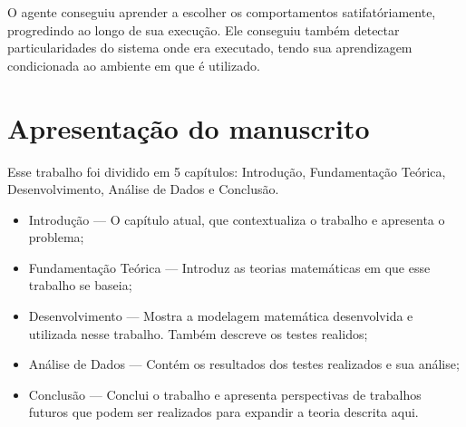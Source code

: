 O agente conseguiu aprender a escolher os comportamentos satifatóriamente, progredindo ao longo de sua execução. Ele conseguiu também detectar particularidades do sistema onde era executado, tendo sua aprendizagem condicionada ao ambiente em que é utilizado.


\section{Apresentação do manuscrito}

Esse trabalho foi dividido em 5 capítulos: Introdução, Fundamentação Teórica, Desenvolvimento, Análise de Dados e Conclusão.

\begin{itemize}
	\item Introdução --- O capítulo atual, que contextualiza o trabalho e apresenta o problema;
	\item Fundamentação Teórica --- Introduz as teorias matemáticas em que esse trabalho se baseia;
	\item Desenvolvimento --- Mostra a modelagem matemática desenvolvida e utilizada nesse trabalho. Também descreve os testes realidos;
	\item Análise de Dados --- Contém os resultados dos testes realizados e sua análise;
	\item Conclusão --- Conclui o trabalho e apresenta perspectivas de trabalhos futuros que podem ser realizados para expandir a teoria descrita aqui.
\end{itemize}
